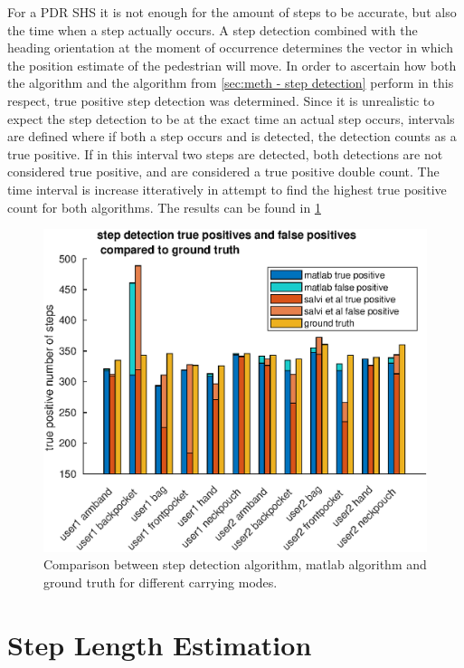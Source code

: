 For a PDR SHS it is not enough for the amount of steps to be accurate, but also the time when a step actually occurs. A step detection combined with the heading orientation at the moment of occurrence determines the vector in which the position estimate of the pedestrian will move. In order to ascertain how both the \citet{Salvi2018} algorithm and the algorithm from \cref{sec:meth - step detection} perform in this respect, true positive step detection was determined. Since it is unrealistic to expect the step detection to be at the exact time an actual step occurs, intervals are defined where if both a step occurs and is detected, the detection counts as a true positive. If in this interval two steps are detected, both detections are not considered true positive, and are considered a true positive double count. The time interval is increase itteratively in attempt to find the highest true positive count for both algorithms. The results can be found in \cref{fig:sd_tp_fp_comparison}
\begin{figure}[H]
	\centering
	\includegraphics[width=0.7\linewidth]{images/20200930_1510_tp_fp_abs_comparison}
\caption{Comparison between \citet{Salvi2018} step detection algorithm, matlab algorithm and ground truth for different carrying modes.}
\label{fig:sd_tp_fp_comparison}
\end{figure}

\newpage

\section{Step Length Estimation}

